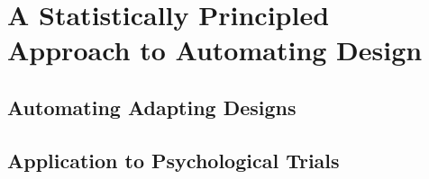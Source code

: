 
\chapter{A Statistically Principled Approach to Automating Design}
\label{chp:design}



\section{Automating Adapting Designs}

\section{Application to Psychological Trials}